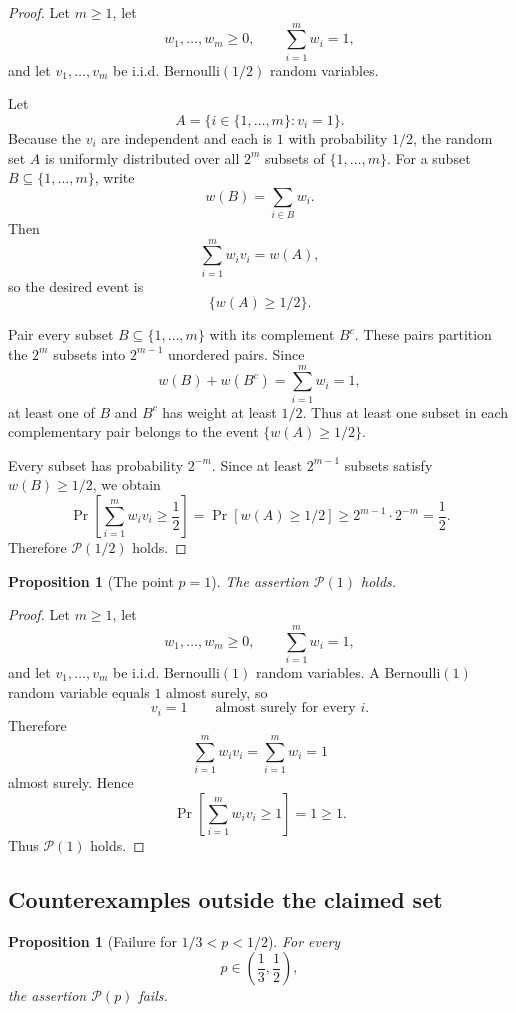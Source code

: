 \documentclass[12pt]{article}
\theoremstyle{definition}
\theoremstyle{plain}
\newtheorem{proposition}[definition]{Proposition}
\theoremstyle{remark}
\begin{document}
\begin{proof}
Let \(m\ge1\), let
\[
w_1,\ldots,w_m\ge0,\qquad \sum_{i=1}^{m}w_i=1,
\]
and let \(v_1,\ldots,v_m\) be i.i.d. Bernoulli\((1/2)\) random variables.

Let
\[
A=\{i\in\{1,\ldots,m\}: v_i=1\}.
\]
Because the \(v_i\) are independent and each is \(1\) with probability \(1/2\), the random set \(A\) is uniformly distributed over all \(2^m\) subsets of \(\{1,\ldots,m\}\). For a subset \(B\subseteq\{1,\ldots,m\}\), write
\[
w(B)=\sum_{i\in B}w_i.
\]
Then
\[
\sum_{i=1}^{m}w_i v_i=w(A),
\]
so the desired event is
\[
\{w(A)\ge1/2\}.
\]

Pair every subset \(B\subseteq\{1,\ldots,m\}\) with its complement \(B^c\). These pairs partition the \(2^m\) subsets into \(2^{m-1}\) unordered pairs. Since
\[
w(B)+w(B^c)=\sum_{i=1}^{m}w_i=1,
\]
at least one of \(B\) and \(B^c\) has weight at least \(1/2\). Thus at least one subset in each complementary pair belongs to the event \(\{w(A)\ge1/2\}\).

Every subset has probability \(2^{-m}\). Since at least \(2^{m-1}\) subsets satisfy \(w(B)\ge1/2\), we obtain
\[
\Pr\!\left[\sum_{i=1}^{m}w_i v_i\ge\frac12\right]
=
\Pr[w(A)\ge1/2]
\ge
2^{m-1}\cdot 2^{-m}
=
\frac12.
\]
Therefore \(\mathcal P(1/2)\) holds.
\end{proof}

\begin{proposition}[The point \(p=1\)]\label{prop:onep}
The assertion \(\mathcal P(1)\) holds.
\end{proposition}

\begin{proof}
Let \(m\ge1\), let
\[
w_1,\ldots,w_m\ge0,\qquad \sum_{i=1}^{m}w_i=1,
\]
and let \(v_1,\ldots,v_m\) be i.i.d. Bernoulli\((1)\) random variables. A Bernoulli\((1)\) random variable equals \(1\) almost surely, so
\[
v_i=1\qquad\text{almost surely for every }i.
\]
Therefore
\[
\sum_{i=1}^{m}w_i v_i
=
\sum_{i=1}^{m}w_i
=
1
\]
almost surely. Hence
\[
\Pr\!\left[\sum_{i=1}^{m}w_i v_i\ge1\right]=1\ge1.
\]
Thus \(\mathcal P(1)\) holds.
\end{proof}

\subsection{Counterexamples outside the claimed set}

\begin{proposition}[Failure for \(1/3<p<1/2\)]\label{prop:countermiddle}
For every
\[
p\in\left(\frac13,\frac12\right),
\]
the assertion \(\mathcal P(p)\) fails.
\end{proposition}
\end{document}
